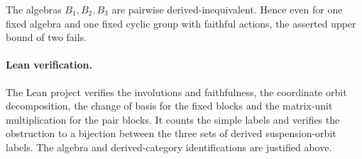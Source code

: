 \documentclass[11pt]{article}
\begin{document}
The algebras \(B_1,B_2,B_3\) are pairwise derived-inequivalent. Hence
even for one fixed algebra and one fixed cyclic group with faithful
actions, the asserted upper bound of two fails.

\paragraph{Lean verification.}
The Lean project verifies the involutions and faithfulness, the coordinate
orbit decomposition, the change of basis for the fixed blocks and the
matrix-unit multiplication for the pair blocks. It counts the simple
labels and verifies the obstruction to a bijection between the three
sets of derived suspension-orbit labels. The algebra and derived-category
identifications are justified above.
\end{document}
